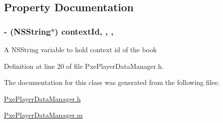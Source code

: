 \subsection{Property Documentation}
\hypertarget{interface_pxe_player_data_manager_a09ec53de035d5a7a96604fa92eaab758}{
\subsubsection[{context\-Id}]{\setlength{\rightskip}{0pt plus 5cm}-\/ (N\-S\-String$\ast$) context\-Id\hspace{0.3cm}{\ttfamily [read]}, {\ttfamily [write]}, {\ttfamily [nonatomic]}, {\ttfamily [strong]}}}\label{interface_pxe_player_data_manager_a09ec53de035d5a7a96604fa92eaab758}
A N\-S\-String variable to hold context id of the book 

Definition at line 20 of file Pxe\-Player\-Data\-Manager.\-h.



The documentation for this class was generated from the following files\-:\begin{DoxyCompactItemize}
\item 
\hyperlink{_pxe_player_data_manager_8h}{Pxe\-Player\-Data\-Manager.\-h}\item 
\hyperlink{_pxe_player_data_manager_8m}{Pxe\-Player\-Data\-Manager.\-m}\end{DoxyCompactItemize}
